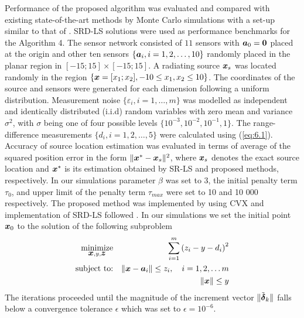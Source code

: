 Performance of the proposed algorithm was evaluated and compared with existing state-of-the-art methods by Monte Carlo simulations with a set-up similar to that of \cite{BeckStLi}. SRD-LS solutions were used as performance benchmarks for the Algorithm 4. The sensor network consisted of $11$ sensors with $\mbox{\boldmath$a$}_0 = \mbox{\boldmath{$0$}}$ placed at the origin and other ten sensors  $\{\mbox{\boldmath$a$}_i, i = 1, 2,\ldots,10\}$ randomly placed in the planar region in $[-15;15]\times[-15;15]$. A radiating source $\mbox{\boldmath$x$}_s$ was located randomly in the region $\{\mbox{\boldmath$x$}=[x_1;x_2], -10\leq x_1,x_2\leq 10\}$. The coordinates of the source and sensors were generated for each dimension following a uniform distribution. Measurement noise $\{\varepsilon_i, i=1,\ldots,m\}$ was modelled as independent and identically distributed (i.i.d) random variables with zero mean and variance $\sigma^2$, with $\sigma$ being one of four possible levels $\{10^{-3}, 10^{-2}, 10^{-1}, 1\}$.  The range-difference measurements $\{d_i, i=1, 2,\ldots,5\}$ were calculated using (\ref{eq:6.1}). Accuracy of source location estimation was evaluated in terms of average of the squared position error in the form $\|\mbox{\boldmath$x$}^*-\mbox{\boldmath$x$}_s\|^2$, where $\mbox{\boldmath$x$}_s$ denotes the exact source location and $\mbox{\boldmath$x$}^*$ is its estimation obtained by SR-LS and proposed methods, respectively.  
In our simulations parameter $\beta$ was set to 3, the initial penalty term $\tau_0$, and upper limit of the penalty term $\tau_{max}$ were set to 10 and 10 000 respectively. The proposed method was implemented by using  CVX  \cite{cvx} and implementation of SRD-LS followed \cite{BeckStLi}. In our simulations we set the initial point $\mbox{\boldmath$x$}_0$ to the solution of the following subproblem
\setcounter{abc}{0}
\begin{eqnarray} \label{eq:initpnt}
\nonumber
\mathop{\mbox{minimize}}_{\mbox{\boldmath$x$}, y, \mbox{\boldmath$z$}} & &\sum^m_{i=1}\left( z_i - y - d_i\right)^2\\
\nonumber
\mbox{subject to:}& &\|\mbox{\boldmath$x$} - \mbox{\boldmath$a$}_i\| \leq z_i, \quad  i = 1, 2, \ldots m \\
\nonumber
& &\|\mbox{\boldmath$x$}\|  \leq y
\end{eqnarray}
\noindent
The iterations proceeded until the magnitude of the increment vector $\|\tilde{\mbox{\boldmath${\delta}$}}_k\|$ falls below a convergence tolerance $\epsilon$ which was set to $\epsilon = 10^{-6}$. 

